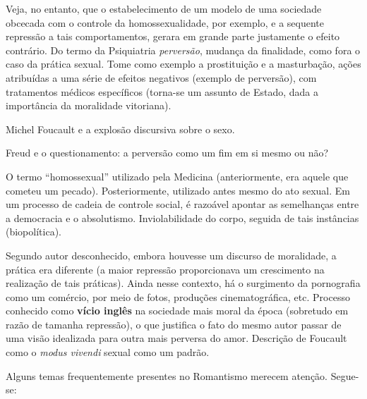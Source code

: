 Veja, no entanto, que o estabelecimento de um modelo de uma sociedade obcecada com o controle da homossexualidade, por exemplo, e a sequente repressão a tais comportamentos, gerara em grande parte justamente o efeito contrário. Do termo da Psiquiatria \textit{perversão}, mudança da finalidade, como fora o caso da prática sexual. Tome como exemplo a prostituição e a masturbação, ações atribuídas a uma série de efeitos negativos (exemplo de perversão), com tratamentos médicos específicos (torna-se um assunto de Estado, dada a importância da moralidade vitoriana).

Michel Foucault e a explosão discursiva sobre o sexo.

Freud e o questionamento: a perversão como um fim em si mesmo ou não?

O termo ``homossexual'' utilizado pela Medicina (anteriormente, era aquele que cometeu um pecado). Posteriormente, utilizado antes mesmo do ato sexual. Em um processo de cadeia de controle social, é razoável apontar as semelhanças entre a democracia e o absolutismo. Inviolabilidade do corpo, seguida de tais instâncias (biopolítica).

Segundo {autor desconhecido}, embora houvesse um discurso de moralidade, a prática era diferente (a maior repressão proporcionava um crescimento na realização de tais práticas). Ainda nesse contexto, há o surgimento da pornografia como um comércio, por meio de fotos, produções cinematográfica, etc. Processo conhecido como \textbf{vício inglês} na sociedade mais moral da época (sobretudo em razão de tamanha repressão), o que justifica o fato do mesmo autor passar de uma visão idealizada para outra mais perversa do amor. Descrição de Foucault como o \textit{modus vivendi} sexual como um padrão.

Alguns temas frequentemente presentes no Romantismo merecem atenção. Segue-se:

